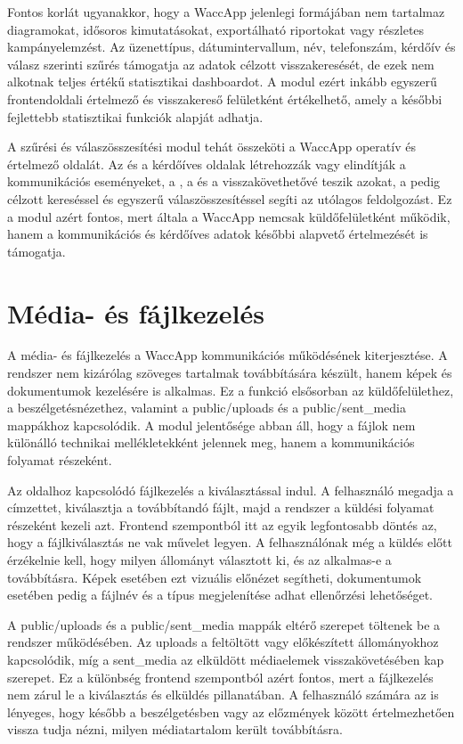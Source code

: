 Fontos korlát ugyanakkor, hogy a WaccApp jelenlegi formájában nem tartalmaz diagramokat, idősoros kimutatásokat, exportálható riportokat vagy részletes kampányelemzést. Az üzenettípus, dátumintervallum, név, telefonszám, kérdőív és válasz szerinti szűrés támogatja az adatok célzott visszakeresését, de ezek nem alkotnak teljes értékű statisztikai dashboardot. A modul ezért inkább egyszerű frontendoldali értelmező és visszakereső felületként értékelhető, amely a későbbi fejlettebb statisztikai funkciók alapját adhatja.

A szűrési és válaszösszesítési modul tehát összeköti a WaccApp operatív és értelmező oldalát. Az  és a kérdőíves oldalak létrehozzák vagy elindítják a kommunikációs eseményeket, a , a  és a  visszakövethetővé teszik azokat, a  pedig célzott kereséssel és egyszerű válaszösszesítéssel segíti az utólagos feldolgozást. Ez a modul azért fontos, mert általa a WaccApp nemcsak küldőfelületként működik, hanem a kommunikációs és kérdőíves adatok későbbi alapvető értelmezését is támogatja.


\section{Média- és fájlkezelés}

A média- és fájlkezelés a WaccApp kommunikációs működésének kiterjesztése. A rendszer nem kizárólag szöveges tartalmak továbbítására készült, hanem képek és dokumentumok kezelésére is alkalmas. Ez a funkció elsősorban az  küldőfelülethez, a  beszélgetésnézethez, valamint a public/uploads és a public/sent\_media mappákhoz kapcsolódik. A modul jelentősége abban áll, hogy a fájlok nem különálló technikai mellékletekként jelennek meg, hanem a kommunikációs folyamat részeként. 

Az  oldalhoz kapcsolódó fájlkezelés a kiválasztással indul. A felhasználó megadja a címzettet, kiválasztja a továbbítandó fájlt, majd a rendszer a küldési folyamat részeként kezeli azt. Frontend szempontból itt az egyik legfontosabb döntés az, hogy a fájlkiválasztás ne vak művelet legyen. A felhasználónak még a küldés előtt érzékelnie kell, hogy milyen állományt választott ki, és az alkalmas-e a továbbításra. Képek esetében ezt vizuális előnézet segítheti, dokumentumok esetében pedig a fájlnév és a típus megjelenítése adhat ellenőrzési lehetőséget. 

A public/uploads és a public/sent\_media mappák eltérő szerepet töltenek be a rendszer működésében. Az uploads a feltöltött vagy előkészített állományokhoz kapcsolódik, míg a sent\_media az elküldött médiaelemek visszakövetésében kap szerepet. Ez a különbség frontend szempontból azért fontos, mert a fájlkezelés nem zárul le a kiválasztás és elküldés pillanatában. A felhasználó számára az is lényeges, hogy később a beszélgetésben vagy az előzmények között értelmezhetően vissza tudja nézni, milyen médiatartalom került továbbításra. 

